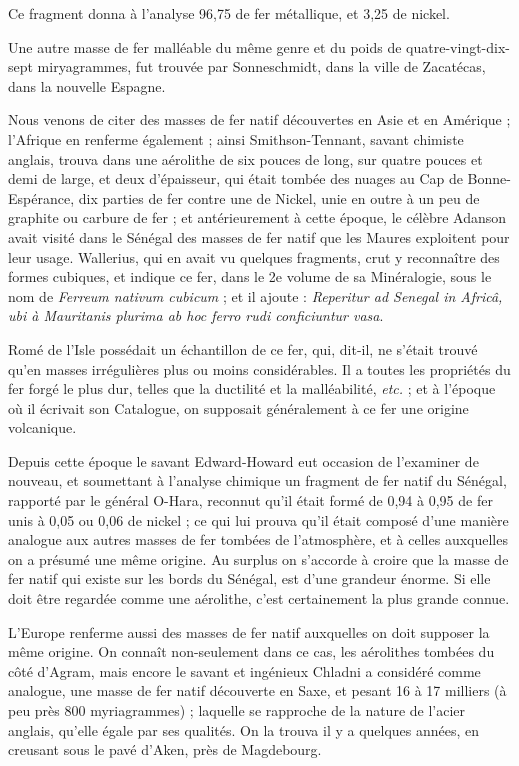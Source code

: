 \documentclass[a4paper, 12pt, oneside, french]{article}
\begin{document}
Ce fragment donna à l'analyse 96,75 de fer métallique, et 3,25 de nickel.

Une autre masse de fer malléable du même genre et du poids de quatre-vingt-dix-sept miryagrammes, fut trouvée par Sonneschmidt, dans la ville de Zacatécas, dans la nouvelle Espagne.

Nous venons de citer des masses de fer natif découvertes en Asie et en Amérique ; l'Afrique en renferme également ; ainsi Smithson-Tennant, savant chimiste anglais, trouva dans une aérolithe de six pouces de long, sur quatre pouces et demi de large, et deux d'épaisseur, qui était tombée des nuages au Cap de Bonne-Espérance, dix parties de fer contre une de Nickel, unie en outre à un peu de graphite ou carbure de fer ; et antérieurement à cette époque, le célèbre Adanson avait visité dans le Sénégal des masses de fer natif que les Maures exploitent pour leur usage. Wallerius, qui en avait vu quelques fragments, crut y reconnaître des formes cubiques, et indique ce fer, dans le 2e volume de sa Minéralogie, sous le nom de \emph{Ferreum nativum cubicum} ; et il ajoute : \emph{Reperitur ad Senegal in Africâ, ubi à Mauritanis plurima ab hoc ferro rudi conficiuntur vasa}.

Romé de l'Isle possédait un échantillon de ce fer, qui, dit-il, ne s'était trouvé qu'en masses irrégulières plus ou moins considérables. Il a toutes les propriétés du fer forgé le plus dur, telles que la ductilité et la malléabilité, \emph{etc.} ; et à l'époque où il écrivait son Catalogue, on supposait généralement à ce fer une origine volcanique.

Depuis cette époque le savant Edward-Howard eut occasion de l'examiner de nouveau, et soumettant à l'analyse chimique un fragment de fer natif du Sénégal, rapporté par le général O-Hara, reconnut qu'il était formé de 0,94 à 0,95 de fer unis à 0,05 ou 0,06 de nickel ; ce qui lui prouva qu'il était composé d'une manière analogue aux autres masses de fer tombées de l'atmosphère, et à celles auxquelles on a présumé une même origine. Au surplus on s'accorde à croire que la masse de fer natif qui existe sur les bords du Sénégal, est d'une grandeur énorme. Si elle doit être regardée comme une aérolithe, c'est certainement la plus grande connue.

L'Europe renferme aussi des masses de fer natif auxquelles on doit supposer la même origine. On connaît non-seulement dans ce cas, les aérolithes tombées du côté d'Agram, mais encore le savant et ingénieux Chladni a considéré comme analogue, une masse de fer natif découverte en Saxe, et pesant 16 à 17 milliers (à peu près 800 myriagrammes) ; laquelle se rapproche de la nature de l'acier anglais, qu'elle égale par ses qualités. On la trouva il y a quelques années, en creusant sous le pavé d'Aken, près de Magdebourg.
\end{document}
